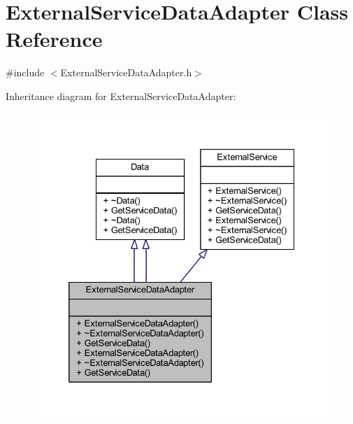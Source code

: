\hypertarget{class_external_service_data_adapter}{}\section{External\+Service\+Data\+Adapter Class Reference}
\label{class_external_service_data_adapter}


{\ttfamily \#include $<$External\+Service\+Data\+Adapter.\+h$>$}



Inheritance diagram for External\+Service\+Data\+Adapter\+:
\nopagebreak
\begin{figure}[H]
\begin{center}
\leavevmode
\includegraphics[width=332pt]{class_external_service_data_adapter__inherit__graph}
\end{center}
\end{figure}


